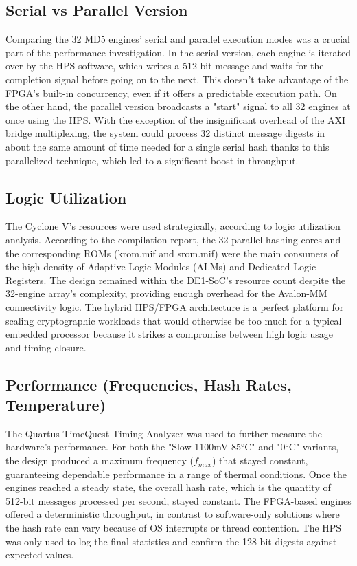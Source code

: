 \documentclass[conference]{IEEEtran}
\begin{document}
\subsection{Serial vs Parallel Version}
Comparing the 32 MD5 engines' serial and parallel execution modes was a crucial part of the performance investigation. In the serial version, each engine is iterated over by the HPS software, which writes a 512-bit message and waits for the completion signal before going on to the next. This doesn't take advantage of the FPGA's built-in concurrency, even if it offers a predictable execution path. On the other hand, the parallel version broadcasts a "start" signal to all 32 engines at once using the HPS. With the exception of the insignificant overhead of the AXI bridge multiplexing, the system could process 32 distinct message digests in about the same amount of time needed for a single serial hash thanks to this parallelized technique, which led to a significant boost in throughput.

\subsection{Logic Utilization}
The Cyclone V's resources were used strategically, according to logic utilization analysis. According to the compilation report, the 32 parallel hashing cores and the corresponding ROMs (krom.mif and srom.mif) were the main consumers of the high density of Adaptive Logic Modules (ALMs) and Dedicated Logic Registers. The design remained within the DE1-SoC's resource count despite the 32-engine array's complexity, providing enough overhead for the Avalon-MM connectivity logic. The hybrid HPS/FPGA architecture is a perfect platform for scaling cryptographic workloads that would otherwise be too much for a typical embedded processor because it strikes a compromise between high logic usage and timing closure.

\subsection{Performance (Frequencies, Hash Rates, Temperature)}
The Quartus TimeQuest Timing Analyzer was used to further measure the hardware's performance. For both the "Slow 1100mV 85°C" and "0°C" variants, the design produced a maximum frequency ($f_{max}$) that stayed constant, guaranteeing dependable performance in a range of thermal conditions. Once the engines reached a steady state, the overall hash rate, which is the quantity of 512-bit messages processed per second, stayed constant. The FPGA-based engines offered a deterministic throughput, in contrast to software-only solutions where the hash rate can vary because of OS interrupts or thread contention. The HPS was only used to log the final statistics and confirm the 128-bit digests against expected values.
\end{document}
